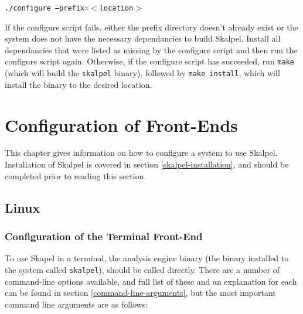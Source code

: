 \documentclass{report}
\begin{document}
\texttt{./configure --prefix=$<$location$>$}

If the configure script fails, either the prefix directory doesn't
already exist or the system does not have the necessary dependancies
to build Skalpel. Install all dependancies that were listed as missing
by the configure script and then run the configure script
again. Otherwise, if the configure script has succeeded, run
\texttt{make} (which will build the \texttt{skalpel} binary), followed
by \texttt{make install}, which will install the binary to the desired
location.


\chapter{Configuration of Front-Ends}

This chapter gives information on how to configure a system to use
Skalpel. Installation of Skalpel is covered in section
\ref{skalpel-installation}, and should be completed prior to reading
this section.

\section{Linux}

\subsection{Configuration of the Terminal Front-End}

To use Skapel in a terminal, the analysis engine binary (the binary
installed to the system called \texttt{skalpel}), should be called
directly. There are a number of command-line options available, and
full list of these and an explanation for each can be found in section
\ref{command-line-arguments}, but the most important command line
arguments are as follows:
\end{document}
